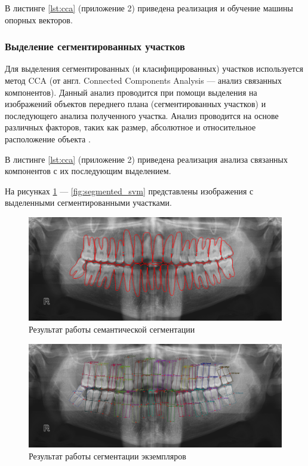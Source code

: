 В листинге \ref{lst:cca} (приложение 2)  приведена реализация и обучение машины опорных векторов.

\subsubsection{Выделение сегментированных участков}

Для выделения сегментированных (и класифицированных) участков используется метод CCA (от англ. Connected Components Analysis --- анализ связанных компонентов). Данный анализ проводится при помощи выделения на изображений объектов переднего плана (сегментированных участков) и последующего анализа полученного участка. Анализ проводится на основе различных факторов, таких как размер, абсолютное и относительное расположение объекта \cite{cca}.

В листинге \ref{lst:cca} (приложение 2)  приведена реализация анализа связанных компонентов с их последующим выделением.

На рисунках \ref{fig:segmented} --- \ref{fig:segmented_svm} представлены изображения с выделенными сегментированными участками.

\begin{figure}[H]
	\centering
	\includegraphics[width=\textwidth]{img/segmented.png}
	\caption{Результат работы семантической сегментации}
	\label{fig:segmented}
\end{figure}

\begin{figure}[H]
	\centering
	\includegraphics[width=\textwidth]{img/segmented_cca.png}
	\caption{Результат работы сегментации экземпляров}
	\label{fig:segmented_cca}
\end{figure}

